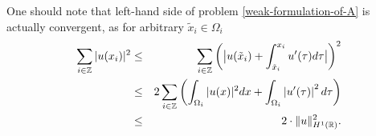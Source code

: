 One should note that left-hand side of problem \eqref{weak-formulation-of-A} is actually convergent, as for arbitrary $\tilde{x}_{i} \in \Omega_{i}$
\begin{eqnarray}
	\sum_{i \in \mathbb{Z}} |u(x_{i})|^{2} & \leq & \sum_{i \in \mathbb{Z}} \left( \big| u(\tilde{x}_{i}) + \int_{\tilde{x}_{i}}^{x_{i}} u'( \tau ) d\tau \big| \right)^{2} \notag \\
		 & \leq & 2 \sum_{i \in \mathbb{Z}} \left( \int_{\Omega_{i}} |u( x )|^{2} dx +  \int_{\Omega_{i}} \left| u'(\tau) \right|^{2} d\tau \right) \notag \\
		 & \leq & 2 \cdot \| u \|^{2}_{H^{1}(\mathbb{R})}. \label{estimation-for-potential}
\end{eqnarray}